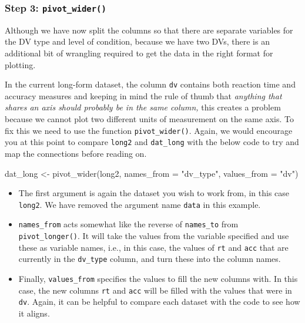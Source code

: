 \documentclass[
  english,
  doc,floatsintext]{apa6}
\newenvironment{Shaded}{\begin{snugshade}}{\end{snugshade}}
\newcommand{\AttributeTok}[1]{\textcolor[rgb]{0.77,0.63,0.00}{#1}}
\newcommand{\FunctionTok}[1]{\textcolor[rgb]{0.00,0.00,0.00}{#1}}
\newcommand{\NormalTok}[1]{#1}
\newcommand{\OtherTok}[1]{\textcolor[rgb]{0.56,0.35,0.01}{#1}}
\newcommand{\StringTok}[1]{\textcolor[rgb]{0.31,0.60,0.02}{#1}}
\begin{document}
\hypertarget{step-3-pivot_wider}{%
\subsubsection{\texorpdfstring{Step 3: \texttt{pivot\_wider()}}{Step 3: pivot\_wider()}}\label{step-3-pivot_wider}}

Although we have now split the columns so that there are separate variables for the DV type and level of condition, because we have two DVs, there is an additional bit of wrangling required to get the data in the right format for plotting.

In the current long-form dataset, the column \texttt{dv} contains both reaction time and accuracy measures and keeping in mind the rule of thumb that \emph{anything that shares an axis should probably be in the same column,} this creates a problem because we cannot plot two different units of measurement on the same axis. To fix this we need to use the function \texttt{pivot\_wider()}. Again, we would encourage you at this point to compare \texttt{long2} and \texttt{dat\_long} with the below code to try and map the connections before reading on.

\begin{Shaded}
\begin{Highlighting}[]
\NormalTok{dat\_long }\OtherTok{\textless{}{-}} \FunctionTok{pivot\_wider}\NormalTok{(long2, }
                        \AttributeTok{names\_from =} \StringTok{"dv\_type"}\NormalTok{, }
                        \AttributeTok{values\_from =} \StringTok{"dv"}\NormalTok{)}
\end{Highlighting}
\end{Shaded}

\begin{itemize}
\item
  The first argument is again the dataset you wish to work from, in this case \texttt{long2}. We have removed the argument name \texttt{data} in this example.
\item
  \texttt{names\_from} acts somewhat like the reverse of \texttt{names\_to} from \texttt{pivot\_longer()}. It will take the values from the variable specified and use these as variable names, i.e., in this case, the values of \texttt{rt} and \texttt{acc} that are currently in the \texttt{dv\_type} column, and turn these into the column names.
\item
  Finally, \texttt{values\_from} specifies the values to fill the new columns with. In this case, the new columns \texttt{rt} and \texttt{acc} will be filled with the values that were in \texttt{dv}. Again, it can be helpful to compare each dataset with the code to see how it aligns.
\end{itemize}
\end{document}
